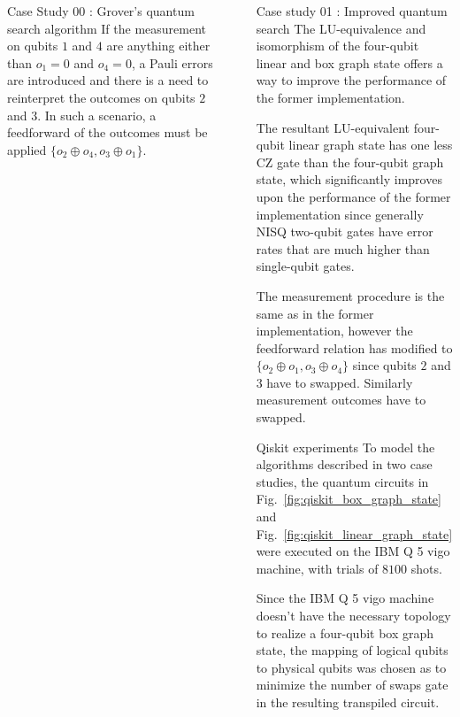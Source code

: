 \documentclass[final]{beamer}
\newlength{\sepwidth}
\newlength{\colwidth}
\newcommand{\separatorcolumn}{\begin{column}{\sepwidth}\end{column}}
\begin{document}
\begin{frame}[t]
\begin{columns}[t]
\begin{column}{\colwidth}
\begin{block}{Case Study 00 : Grover's quantum search algorithm}
                    If the measurement on qubits $1$ and $4$ are anything either
                    than $o_1= 0$ and $o_4= 0$, a Pauli errors are introduced and there
                    is a need to reinterpret the outcomes on qubits $2$ and $3$. In such a scenario, a
                    feedforward of the outcomes must be applied $\{o_2 \oplus o_4, o_3 \oplus o_ 1\}$.
                \end{block}
            \end{column}

            \separatorcolumn

            \begin{column}{\colwidth}
                \begin{block}{Case study 01 : Improved quantum search}
                    The LU-equivalence and isomorphism of the four-qubit linear and box
                    graph state offers a way to improve the performance of the
                    former implementation.

                    The resultant LU-equivalent four-qubit
                    linear graph state has one less $\text{CZ}$ gate than the
                    four-qubit graph state, which significantly improves upon
                    the performance of the former implementation since generally
                    NISQ two-qubit gates have error rates that are much higher than
                    single-qubit gates.

                    The measurement procedure is the same as in the former
                    implementation, however the feedforward relation has
                    modified to $\{o_2 \oplus o_1, o_3 \oplus o_4 \}$ since
                    qubits $2$ and $3$ have to swapped. Similarly measurement outcomes have
                    to swapped.

                \end{block}
                \begin{block}{Qiskit experiments}
                    To model the algorithms described in two case studies, the
                    quantum circuits in Fig.~\ref{fig:qiskit_box_graph_state}
                    and Fig.~\ref{fig:qiskit_linear_graph_state} were executed on the
                    IBM Q 5 vigo machine, with trials of $8100$ shots.

                    Since the IBM Q 5 vigo machine doesn't have the necessary
                    topology to realize a four-qubit box graph state, the
                    mapping of logical qubits to physical qubits was chosen as to minimize the
                    number of swaps gate in the resulting transpiled circuit.


\end{block}
\end{column}
\end{columns}
\end{frame}
\end{document}
